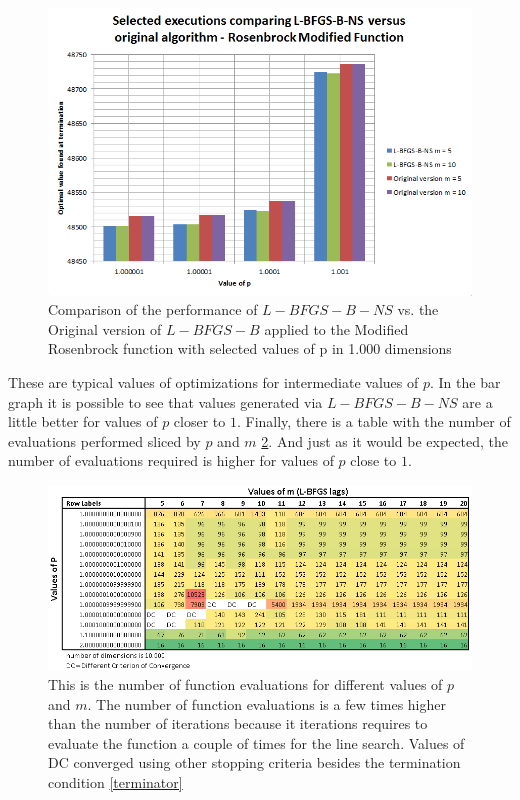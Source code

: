\begin{figure}
\begin{center}
\includegraphics[scale=0.75]{Figures/ComparisonNewOld.PNG}
\caption[Comparison of selected values of the Modified Rosenbrock function]{Comparison of the performance of $L-BFGS-B-NS$ vs. the Original version of $L-BFGS-B$ applied to the Modified Rosenbrock function with selected values of p in 1.000 dimensions}
\label{pcomp}
\end{center}
\end{figure}

These are typical values of optimizations for intermediate values of $p$. In the bar graph it is possible to see that values generated via $L-BFGS-B-NS$ are a little better for values of $p$ closer to $1$. Finally, there is a table with the number of evaluations performed sliced by $p$ and $m$ \ref{pmtable}. And just as it would be expected, the number of evaluations required is higher for values of $p$ close to $1$.

\begin{figure}
\begin{center}
\includegraphics[scale=0.75]{Figures/Niterations.PNG}
\caption[Number of function evaluations for different values of $p$ and $m$ in the solution of Modified Rosenbrock]{This is the number of function evaluations for different values of $p$ and $m$. The number of function evaluations is a few times higher than the number of iterations because it iterations requires to evaluate the function a couple of times for the line search. Values of DC converged using other stopping criteria besides the termination condition \ref{terminator}}
\label{pmtable}
\end{center}
\end{figure}

